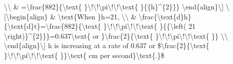 \textbackslash\textbackslash{} \& =\textbackslash frac\{882\}\{\textbackslash text\{
\}\textbackslash !\textbackslash !\textbackslash pi\textbackslash !\textbackslash !\textbackslash text\{
\}\{\{h\}\textasciicircum\{2\}\}\} \textbackslash end\{align\}\textbackslash{]}
\textbackslash{[}\textbackslash begin\{align\} \& \textbackslash text\{When
\}h=21, \textbackslash\textbackslash{} \& \textbackslash frac\{\textbackslash text\{d\}h\}\{\textbackslash text\{d\}t\}=\textbackslash frac\{882\}\{\textbackslash text\{
\}\textbackslash !\textbackslash !\textbackslash pi\textbackslash !\textbackslash !\textbackslash text\{
\}\{\{\textbackslash left( 21 \textbackslash right)\}\textasciicircum\{2\}\}\}=0.637\textbackslash text\{
or \}\textbackslash frac\{2\}\{\textbackslash text\{ \}\textbackslash !\textbackslash !\textbackslash pi\textbackslash !\textbackslash !\textbackslash text\{
\}\} \textbackslash\textbackslash{} \textbackslash end\{align\}\textbackslash{]}
h is increasing at a rate of 0.637 or \$\textbackslash frac\{2\}\{\textbackslash text\{
\}\textbackslash !\textbackslash !\textbackslash pi\textbackslash !\textbackslash !\textbackslash text\{
\}\}\textbackslash text\{ cm per second\}\textbackslash text\{.\}\$